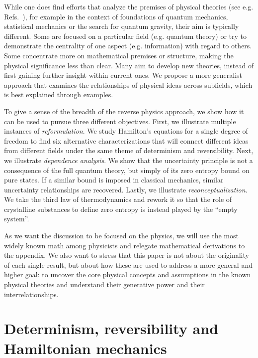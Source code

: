 \documentclass[10pt,twocolumn, nofootinbib]{revtex4-2}
\begin{document}
While one does find efforts that analyze the premises of physical theories (see e.g. Refs.~\cite{chiribella2011informational, selby2021reconstructing, giles2016mathematical, boyling1972axiomatic, PhysRev.101.860, Haag1964848, axiomaticQFT1975, masanes2019measurement, carcassi2021four}), for example in the context of foundations of quantum mechanics, statistical mechanics or the search for quantum gravity, their aim is typically different. Some are focused on a particular field (e.g. quantum theory) or try to demonstrate the centrality of one aspect (e.g. information) with regard to others. Some concentrate more on mathematical premises or structure, making the physical significance less than clear. Many aim to develop new theories, instead of first gaining further insight within current ones. We propose a more generalist approach that examines the relationships of physical ideas across subfields, which is best explained through examples. 


To give a sense of the breadth of the reverse physics approach, we show how it can be used to pursue three different objectives. First, we illustrate multiple instances of \emph{reformulation}. We study Hamilton's equations for a single degree of freedom to find six alternative characterizations that will connect different ideas from different fields under the same theme of determinism and reversibility. Next, we illustrate \emph{dependence analysis}. We show that the uncertainty principle is not a consequence of the full quantum theory, but simply of its zero entropy bound on pure states. If a similar bound is imposed in classical mechanics, similar uncertainty relationships are recovered. Lastly, we illustrate \emph{reconceptualization}. We take the third law of thermodynamics and rework it so that the role of crystalline substances to define zero entropy is instead played by the ``empty system''.

As we want the discussion to be focused on the physics, we will use the most widely known math among physicists and relegate mathematical derivations to the appendix. We also want to stress that this paper is not about the originality of each single result, but about how these are used to address a more general and higher goal: to uncover the core physical concepts and assumptions in the known physical theories and understand their generative power and their interrelationships. 


\section{Determinism, reversibility and Hamiltonian mechanics}
\end{document}
